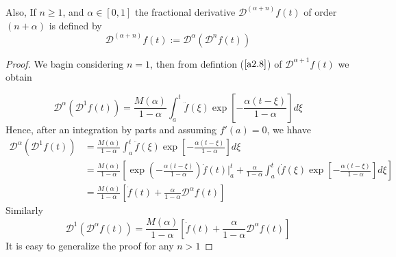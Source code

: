 \documentclass[twoside]{book}
\begin{document}
{\begin{align*}
\end{align*}
Also, If $n\geq 1$, and $\alpha \in [0,1]$ the fractional derivative $\mathcal{D}^{(\alpha +n )} f(t)$ of order $(n+\alpha)$ is defined by
\begin{equation}
    \label{a2.8}
    \mathcal{D}^{(\alpha +n )} f(t) := \mathcal{D}^{\alpha}(\mathcal{D}^{n} f(t))
\end{equation}
\begin{proof}
    We bagin considering $n=1$, then from defintion ($\ref{a2.8}$) of $\mathcal{D}^{\alpha +1} f(t)$ we obtain

    \begin{equation}
        \label{a2.10}
        \mathcal{D}^{\alpha} (\mathcal{D}^{1} f(t)) = \frac{M(\alpha)}{1-\alpha} \int_a^t \ddot{f}(\xi) \exp\left[ - \frac{\alpha(t-\xi)}{1-\alpha} \right] d\xi
    \end{equation}
    Hence, after an integration by parts and assuming $f'(a) = 0$, we hhave
    \begin{align*}
        \mathcal{D}^{\alpha}(\mathcal{D}^{1} f(t)) & = \frac{M(\alpha)}{1-\alpha} \int_a^t  \ddot{f}(\xi) \exp\left[- \frac{\alpha(t-\xi)}{1-\alpha}\right] d\xi                                                                                                   \\
                                                   & = \frac{M(\alpha)}{1-\alpha}\left[ \exp(-\frac{\alpha(t-\xi)}{1-\alpha}) \dot{f}(t)|_{a}^{t} +\frac{\alpha }{1-\alpha} \int_a^t (\dot{f}(\xi) \exp\left[ -\frac{\alpha(t-\xi)}{1-\alpha} \right] d\xi \right] \\
                                                   & = \frac{M(\alpha)}{1-\alpha} \left[\dot{f}(t) +\frac{\alpha}{1-\alpha} \mathcal{D}^{\alpha}f(t)\right]
    \end{align*}
    Similarly
    $$\mathcal{D}^{1}(\mathcal{D}^{\alpha}f(t)) = \frac{M(\alpha)}{1-\alpha} \left[\dot{f}(t) +\frac{\alpha}{1-\alpha} \mathcal{D}^{\alpha}f(t) \right]$$
    It is easy to generalize the proof for any $n>1$
\end{proof}

}
\end{document}
